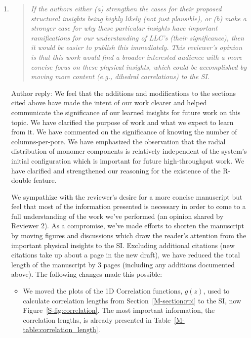 \documentclass{article}
\begin{document}
\begin{enumerate}

	\item \begin{quote}
    \textit{If the authors either (a) strengthen the cases for their proposed structural
    insights being  highly likely (not just plausible), or (b) make a stronger case for
    why these particular insights have important ramifications for our understanding of 
    LLC's (their significance), then it would be easier to publish this immediately. This
    reviewer's opinion is that this work would find a broader interested audience with a more
    concise focus on these physical insights, which could be accomplished by moving more
    content (e.g., dihedral correlations) to the SI.}
    \end{quote}
    
    Author reply: We feel that the additions and modifications to the sections cited above 
    have made the intent of our work clearer and helped communicate the significance of 
    our learned insights for future work on this topic. We have clarified the purpose of work
    and what we expect to learn from it. We have commented on the significance of knowing the
    number of columns-per-pore. We have emphasized the observation that the radial distribution
    of monomer components is relatively independent of the system's initial configuration
    which is important for future high-throughput work. We have clarified and strengthened our
    reasoning for the existence of the R-double feature.
    
    We sympathize with the reviewer's desire for a more concise manuscript but feel that most 
    of the information presented is necessary in order to come to a full understanding of the 
    work we've performed (an opinion shared by Reviewer 2). As a compromise, we've made efforts 
    to shorten the manuscript by moving figures and discussions which draw the reader's attention
    from the important physical insights to the SI. Excluding additional citations (new citations
    take up about a page in the new draft), we have reduced the total length of the manuscript 
    by 3 pages (including any additions documented above). The following changes made this possible:
    
    \begin{itemize}
    
    \item We moved the plots of the 1D Correlation functions, $g(z)$, used to calculate 
    correlation lengths from Section~\ref{M-section:rpi} to the SI, now Figure~\ref{S-fig:correlation}.
    The most important information, the correlation lengths, is already presented in 
    Table~\ref{M-table:correlation_length}.
    

\end{itemize}
\end{enumerate}
\end{document}
